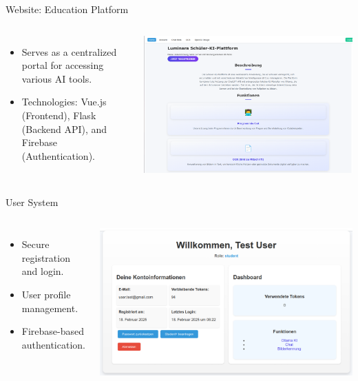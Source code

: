 \documentclass{beamer}
\begin{document}
\begin{frame}{Website: Education Platform}
  \begin{columns}
      \begin{itemize}
        \item Serves as a centralized portal for accessing various AI tools.
        \item Technologies: Vue.js (Frontend), Flask (Backend API), and Firebase (Authentication).
      \end{itemize}
      \centering
      \includegraphics[width=\textwidth]{homepage-screenshot.png}
  \end{columns}
\end{frame}

\begin{frame}{User System}
  \begin{columns}
      \begin{itemize}
        \item Secure registration and login.
        \item User profile management.
        \item Firebase-based authentication.
      \end{itemize}
      \centering
      \includegraphics[width=\textwidth]{Account-Managment.png}
  \end{columns}
\end{frame}
\end{document}
